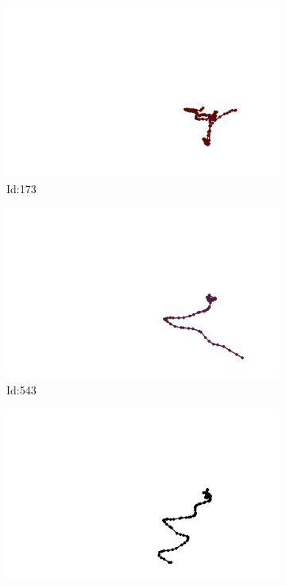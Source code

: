 \documentclass[12pt,twoside]{report}
\begin{document}
\begin{figure}
\centering
\begin{subfigure}[b]{0.20\textwidth}
\centering
\includegraphics[width=\textwidth]{../trajectories/173.png}
\caption{Id:173}
\end{subfigure}
\begin{subfigure}[b]{0.20\textwidth}
\centering
\includegraphics[width=\textwidth]{../trajectories/543.png}
\caption{Id:543}
\end{subfigure}
\begin{subfigure}[b]{0.20\textwidth}
\centering
\includegraphics[width=\textwidth]{../trajectories/577.png}

\end{subfigure}
\end{figure}
\end{document}
